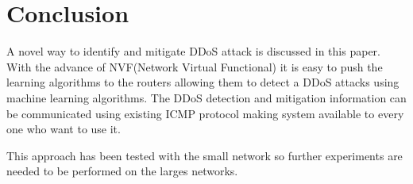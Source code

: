 \documentclass[10pt,oneside,a4paper]{article}
\begin{document}
\section{Conclusion}

A novel way to identify and mitigate DDoS attack is discussed in this paper. With the advance of NVF(Network Virtual Functional) it is easy to push the learning algorithms to the routers allowing them to detect a DDoS attacks using machine learning algorithms. The DDoS detection and mitigation information can be communicated using existing ICMP protocol making system available to every one who want to use it.

This approach has been tested with the small network so further experiments are needed to be performed on the larges networks.

\end{document}
